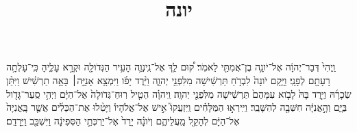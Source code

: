 \documentclass{openreader}
\title{יונה}
\date{}
\begin{document}
\maketitle
\raggedbottom 
\fontsize{16pt}{24pt}\selectfont


וַֽיְהִי֙ דְּבַר־יְהוָ֔ה אֶל־יֹונָ֥ה בֶן־אֲמִתַּ֖י לֵאמֹֽר׃ 
ק֠וּם לֵ֧ךְ אֶל־נִֽינְוֵ֛ה הָעִ֥יר הַגְּדֹולָ֖ה וּקְרָ֣א עָלֶ֑יהָ כִּֽי־עָלְתָ֥ה רָעָתָ֖ם לְפָנָֽי׃ 
וַיָּ֤קָם יֹונָה֙ לִבְרֹ֣חַ תַּרְשִׁ֔ישָׁה מִלִּפְנֵ֖י יְהוָ֑ה וַיֵּ֨רֶד יָפֹ֜ו וַיִּמְצָ֥א אָנִיָּ֣ה׀ בָּאָ֣ה תַרְשִׁ֗ישׁ וַיִּתֵּ֨ן שְׂכָרָ֜הּ וַיֵּ֤רֶד בָּהּ֙ לָבֹ֤וא עִמָּהֶם֙ תַּרְשִׁ֔ישָׁה מִלִּפְנֵ֖י יְהוָֽה׃ 
וַֽיהוָ֗ה הֵטִ֤יל רֽוּחַ־גְּדֹולָה֙ אֶל־הַיָּ֔ם וַיְהִ֥י סַֽעַר־גָּדֹ֖ול בַּיָּ֑ם וְהָ֣אֳנִיָּ֔ה חִשְּׁבָ֖ה לְהִשָּׁבֵֽר׃ 
וַיִּֽירְא֣וּ הַמַּלָּחִ֗ים וַֽיִּזְעֲקוּ֮ אִ֣ישׁ אֶל־אֱלֹהָיו֒ וַיָּטִ֨לוּ אֶת־הַכֵּלִ֜ים אֲשֶׁ֤ר בָּֽאֳנִיָּה֙ אֶל־הַיָּ֔ם לְהָקֵ֖ל מֵֽעֲלֵיהֶ֑ם וְיֹונָ֗ה יָרַד֙ אֶל־יַרְכְּתֵ֣י הַסְּפִינָ֔ה וַיִּשְׁכַּ֖ב וַיֵּרָדַֽם׃ 
\end{document}
